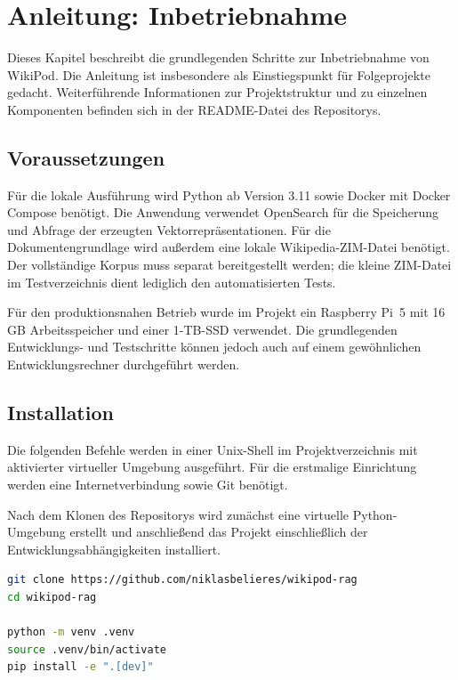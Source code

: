 \chapter{Anleitung: Inbetriebnahme}
\label{ch:anleitung}
\begingroup
\lstset{showstringspaces=false}

Dieses Kapitel beschreibt die grundlegenden Schritte zur Inbetriebnahme von
WikiPod. Die Anleitung ist insbesondere als Einstiegspunkt für Folgeprojekte
gedacht. Weiterführende Informationen zur Projektstruktur und zu einzelnen
Komponenten befinden sich in der README-Datei des Repositorys.

\section{Voraussetzungen}

Für die lokale Ausführung wird Python ab Version 3.11 sowie Docker mit Docker
Compose benötigt. Die Anwendung verwendet OpenSearch für die Speicherung und
Abfrage der erzeugten Vektorrepräsentationen. Für die Dokumentengrundlage wird
außerdem eine lokale Wikipedia-ZIM-Datei benötigt. Der vollständige Korpus muss separat bereitgestellt werden; die kleine
ZIM-Datei im Testverzeichnis dient lediglich den automatisierten Tests.

Für den produktionsnahen Betrieb wurde im Projekt ein Raspberry Pi~5 mit
16\,GB Arbeitsspeicher und einer 1-TB-SSD verwendet. Die grundlegenden
Entwicklungs- und Testschritte können jedoch auch auf einem gewöhnlichen
Entwicklungsrechner durchgeführt werden.

\section{Installation}

Die folgenden Befehle werden in einer Unix-Shell im Projektverzeichnis
mit aktivierter virtueller Umgebung ausgeführt. Für die erstmalige Einrichtung
werden eine Internetverbindung sowie Git benötigt.

Nach dem Klonen des Repositorys wird zunächst eine virtuelle Python-Umgebung
erstellt und anschließend das Projekt einschließlich der
Entwicklungsabhängigkeiten installiert.

\par\nopagebreak[4]\smallskip
\noindent\begin{minipage}[t]{\linewidth}
\vspace{0pt}
\begin{lstlisting}[language=bash]
git clone https://github.com/niklasbelieres/wikipod-rag
cd wikipod-rag

python -m venv .venv
source .venv/bin/activate
pip install -e ".[dev]"
\end{lstlisting}
\end{minipage}\par\smallskip


